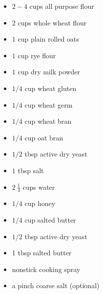 \begin{minipage}{\textwidth}
\begin{multicols*}{2}
\begin{minipage}{\linewidth}
\ingredients[Dry]
\vspace{-1em}
\begin{itemize}
    \item $2-4$ cups all purpose flour
    \item $2$ cups whole wheat flour\footnotemark[1]
    \item $1$ cup plain rolled oats
    \item $1$ cup rye flour\footnotemark[2]
    \item $1$ cup dry milk powder
    \item $1/4$ cup wheat gluten
    \item $1/4$ cup wheat germ\footnotemark[3]
    \item $1/4$ cup wheat bran\footnotemark[3]
    \item $1/4$ cup oat bran\footnotemark[3]
    \item $1/2$ tbsp active dry yeast
    \item $1$ tbsp salt
\end{itemize}
\end{minipage}

\columnbreak
\begin{minipage}{\linewidth}
\ingredients[Wet]
\vspace{-1em}
\begin{itemize}
    \item $2~\frac{1}{4}$ cups water
    \item $1/4$ cup honey\footnotemark[4]
    \item $1/4$ cup salted butter
    \item $1/2$ tbsp active dry yeast
\end{itemize}
\ingredients[Miscellaneous]
\vspace{-1em}
\begin{itemize}
    \item 1 tbsp salted butter
    \item nonstick cooking spray
    \item a pinch coarse salt (optional)
\end{itemize}
\end{minipage}
\end{multicols*}
\end{minipage}
\setcounter{footnote}{0}
\vspace{1em}

